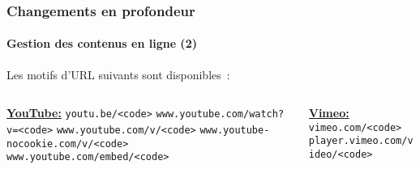 \begin{frame}[fragile]
	\frametitle{Changements en profondeur}
	\framesubtitle{Gestion des contenus en ligne (2)}

	Les motifs d'URL suivants sont disponibles~:
	\vspace{0.4cm}

	\begin{columns}[T]
		\begin{column}{.52\textwidth}
			\smaller
				\tabto{0.2cm}\textbf{\underline{YouTube:}}\newline
				\tabto{0.2cm}\texttt{youtu.be/<code>}\newline
				\tabto{0.2cm}\texttt{www.youtube.com/watch?v=<code>}\newline
				\tabto{0.2cm}\texttt{www.youtube.com/v/<code>}\newline
				\tabto{0.2cm}\texttt{www.youtube-nocookie.com/v/<code>}\newline
				\tabto{0.2cm}\texttt{www.youtube.com/embed/<code>}\newline
		\end{column}
		\begin{column}{.48\textwidth}
			\vspace{-0.25cm}\smaller
				\textbf{\underline{Vimeo:}}\newline
				\texttt{vimeo.com/<code>}\newline
				\texttt{player.vimeo.com/video/<code>}\newline
		\end{column}
	\end{columns}

\end{frame}


